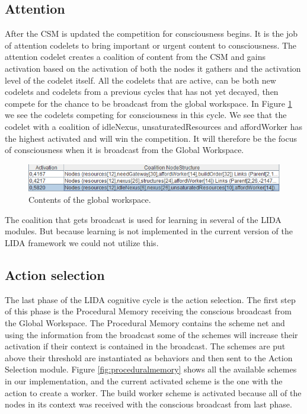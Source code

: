 \subsection{Attention}
After the CSM is updated the competition for consciousness begins. It is the job of attention codelets to bring important or urgent content to consciousness. The attention codelet creates a coalition of content from the CSM and gains activation based on the activation of both the nodes it gathers and the activation level of the codelet itself. All the codelets that are active, can be both new codelets and codelets from a previous cycles that has not yet decayed, then compete for the chance to be broadcast from the global workspace. In Figure \ref{fig:workspace} we see the codelets competing for consciousness in this cycle. We see that the codelet with a coalition of idleNexus, unsaturatedResources and affordWorker has the highest activated and will win the competition. It will therefore be the focus of consciousness when it is broadcast from the Global Workspace.

\begin{figure}[h!tb]
\centering
\includegraphics[width=\textwidth]{graphics/global_workspace.png}
\caption{Contents of the global workspace.}
\label{fig:workspace}
\end{figure}

The coalition that gets broadcast is used for learning in several of the LIDA modules. But because learning is not implemented in the current version of the LIDA framework we could not utilize this.

\subsection{Action selection}
\label{sec:action_selection}
The last phase of the LIDA cognitive cycle is the action selection. The first step of this phase is the Procedural Memory receiving the conscious broadcast from the Global Workspace. The Procedural Memory contains the scheme net and using the information from the broadcast some of the schemes will increase their activation if their context is contained in the broadcast. The schemes are put above their threshold are instantiated as behaviors and then sent to the Action Selection module. Figure \ref{fig:proceduralmemory} shows all the available schemes in our implementation, and the current activated scheme is the one with the action to create a worker. The build worker scheme is activated because all of the nodes in its context was received with the conscious broadcast from last phase.

